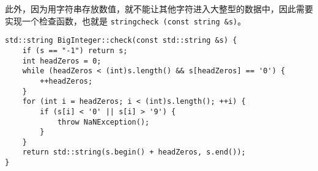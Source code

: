 {此外，因为用字符串存放数值，就不能让其他字符进入大整型的数据中，因此需要实现一个检查函数，也就是 \lstinline{stringcheck (const string &s)}。

\begin{lstlisting}[firstnumber=301, caption=\lstinline{check} 函数实现]
std::string BigInteger::check(const std::string &s) {
    if (s == "-1") return s;
    int headZeros = 0;
    while (headZeros < (int)s.length() && s[headZeros] == '0') {
        ++headZeros;
    }
    for (int i = headZeros; i < (int)s.length(); ++i) {
        if (s[i] < '0' || s[i] > '9') {
            throw NaNException();
        }
    }
    return std::string(s.begin() + headZeros, s.end());
}
\end{lstlisting}
}